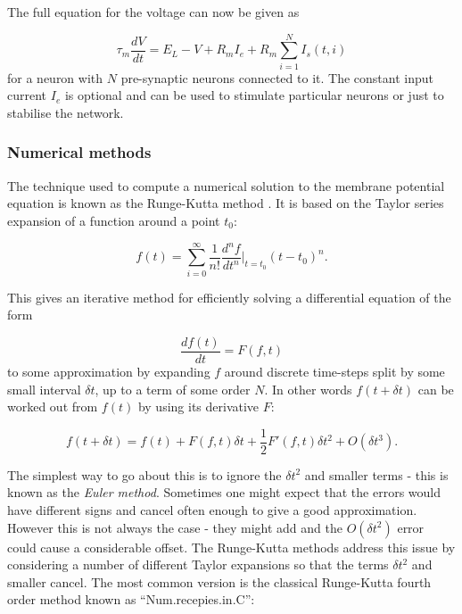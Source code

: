 \documentclass[12pt]{extarticle}
\begin{document}
\noindent
The full equation for the voltage can now be given as

\begin{equation}
\tau_m\frac{dV}{dt} = E_L - V + R_mI_e + R_m\sum_{i=1}^{N}I_s(t,i)
\end{equation}
for a neuron with $N$ pre-synaptic neurons connected to it. The constant input current $I_e$ is optional and can be used to stimulate particular neurons or just to stabilise the network.\\


\subsubsection*{Numerical methods}
\noindent
The technique used to compute a numerical solution to the membrane potential equation is known as the Runge-Kutta method \cite{Num.recepies.in.C}. It is based on the Taylor series expansion of a function around a point $t_0$:

\begin{equation}
f(t) = \sum_{i=0}^{\infty} \frac{1}{n!} \frac{d^nf}{dt^n}\biggr\rvert_{t=t_0} (t-t_0)^n.
\end{equation}

\noindent
This gives an iterative method for efficiently solving a differential equation of the form

\begin{equation}
\frac{df(t)}{dt} = F(f,t)
\end{equation}
to some approximation by expanding $f$ around discrete time-steps split by some small interval $\delta t$, up to a term of some order $N$. In other words $f(t+\delta t)$ can be worked out from $f(t)$ by using its derivative $F$:

\begin{equation}
f(t+\delta t) = f(t) + F(f,t)\delta t + \frac{1}{2}F'(f,t)\delta t^2 + O(\delta t^3).
\end{equation}

\noindent
The simplest way to go about this is to ignore the $\delta t^2$ and
smaller terms - this is known as the \textit{Euler method}. Sometimes
one might expect that the errors would have different signs and cancel
often enough to give a good approximation. However this is not always
the case - they might add and the $O(\delta t^2)$ error could cause a
considerable offset. The Runge-Kutta methods address this issue by
considering a number of different Taylor expansions so that the terms
$\delta t^2$ and smaller cancel. The most common version is the
classical Runge-Kutta fourth order method known as ``Num.recepies.in.C'':\\
\end{document}
